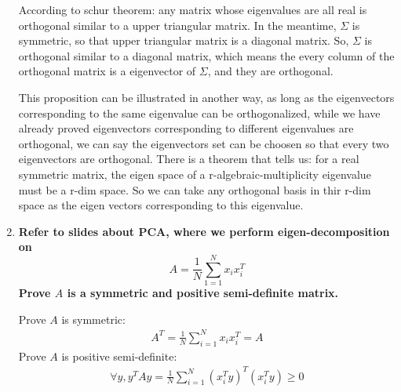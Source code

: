 \documentclass[paper=a4, fontsize=11pt]{scrartcl} %
\numberwithin{equation}{section} %
\numberwithin{figure}{section} %
\numberwithin{table}{section} %
\begin{document}
\begin{enumerate}[a]
  According to schur theorem: any matrix whose eigenvalues are all real is orthogonal similar to a upper triangular matrix. In the meantime, $\Sigma$ is symmetric, so that upper triangular matrix is a diagonal matrix. So, $\Sigma$ is orthogonal similar to a diagonal matrix, which means the every column of the orthogonal matrix is a eigenvector of $\Sigma$, and they are orthogonal.

  This proposition can be illustrated in another way, as long as the eigenvectors corresponding to the same eigenvalue can be orthogonalized, while we have already proved eigenvectors corresponding to different eigenvalues are orthogonal, we can say the eigenvectors set can be choosen so that every two eigenvectors are orthogonal. There is a theorem that tells us: for a real symmetric matrix, the eigen space of a r-algebraic-multiplicity eigenvalue must be a r-dim space. So we can take any orthogonal basis in thir r-dim space as the eigen vectors corresponding to this eigenvalue.

\item \textbf{Refer to slides about PCA, where we perform eigen-decomposition on}
  \[
  A = \frac{1}{N} \displaystyle \sum_{1=1}^{N} x_i x_i^T
  \]
  \textbf{Prove $A$ is a symmetric and positive semi-definite matrix.}

  Prove $A$ is symmetric:
  \[
  \begin{split}
    A^T = \frac{1}{N} \displaystyle\sum_{i=1}^{N} x_i x_i^T = A
  \end{split}
  \]
  Prove $A$ is positive semi-definite:
  \[
  \begin{split}
    \forall y, y^T A y = \frac{1}{N} \displaystyle\sum_{i=1}^{N} (x_i^T y)^T (x_i^T y) \geq 0
  \end{split}
  \]
\end{enumerate}

\end{document}
